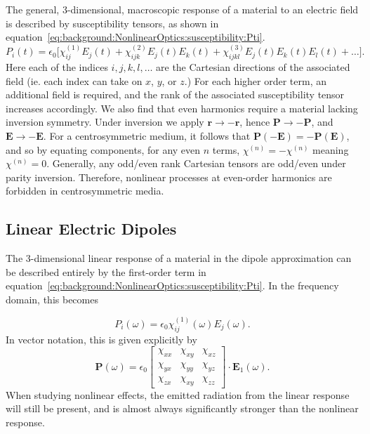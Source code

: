 The general, 3-dimensional, macroscopic response of a material to an electric field is described by susceptibility tensors, as shown in equation~\ref{eq:background:NonlinearOptics:susceptibility:Pti}.
\begin{equation}\label{eq:background:NonlinearOptics:susceptibility:Pti}
	P_{i}(t) =  \epsilon_{0}\big[
				\chi^{(1)}_{ij}  E_{j}(t) +
				\chi^{(2)}_{ijk}  E_{j}(t) E_{k}(t) +
				\chi^{(3)}_{ijkl}  E_{j}(t) E_{k}(t) E_{l}(t)+ \ldots
				\big].
\end{equation}
Here each of the indices $i,j,k,l,\ldots$ are the Cartesian directions of the associated field (ie. each index can take on $x$, $y$, or $z$.) For each higher order term, an additional field is required, and the rank of the associated susceptibility tensor increases accordingly. 
We also find that even harmonics require a material lacking inversion symmetry. Under inversion we apply $\mathbf{r}\rightarrow -\mathbf{r}$, hence $\mathbf{P} \rightarrow -\mathbf{P}$, and $\mathbf{E} \rightarrow -\mathbf{E}$. For a centrosymmetric medium, it follows that $\mathbf{P}(-\mathbf{E}) = -\mathbf{P}(\mathbf{E})$, and so by equating components, for any even $n$ terms, $\chi^{(n)}=-\chi^{(n)}$ meaning $\chi^{(n)} = 0$. Generally, any odd/even rank Cartesian tensors are odd/even under parity inversion. Therefore, nonlinear processes at even-order harmonics are forbidden in centrosymmetric media.

\subsection{Linear Electric Dipoles}\label{sec:background:NonlinearOptics:linearP}
The 3-dimensional linear response of a material in the dipole approximation can be described entirely by the first-order term in equation~\ref{eq:background:NonlinearOptics:susceptibility:Pti}. In the frequency domain, this becomes

\begin{equation}
	P_{i}(\omega) =  \epsilon_{0}
				\chi^{(1)}_{ij}(\omega)  E_{j}(\omega).
\end{equation}
In vector notation, this is given explicitly by
\begin{equation}
	\mathbf{P}(\omega) =  \epsilon_{0}
				\begin{bmatrix}
		\chi_{xx} & \chi_{xy} & \chi_{xz}\\ 
		\chi_{yx} & \chi_{yy} & \chi_{yz}\\ 
		\chi_{zx} & \chi_{xy} & \chi_{zz}
	\end{bmatrix} \cdot \mathbf{E}_{1}(\omega).
\end{equation}
When studying nonlinear effects, the emitted radiation from the linear response will still be present, and is almost always significantly stronger than the nonlinear response.


